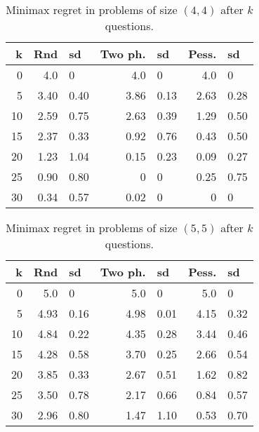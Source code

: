 \begin{table}
	\begin{center}
		\begin{tabular}{rr@{ ± }lr@{ ± }lr@{ ± }l}
			\toprule
			k & Rnd & sd & Two ph. & sd & Pess. & sd \\
			\midrule
			0 & 4.0 & 0 & 4.0 & 0 & 4.0 & 0\\
			5 & 3.40 & 0.40 & 3.86 & 0.13 & 2.63 & 0.28\\
			10 & 2.59 & 0.75 & 2.63 & 0.39 & 1.29 & 0.50\\
			15 & 2.37 & 0.33 & 0.92 & 0.76 & 0.43 & 0.50\\
			20 & 1.23 & 1.04 & 0.15 & 0.23 & 0.09 & 0.27\\
			25 & 0.90 & 0.80 & 0 & 0 & 0.25 & 0.75 \\
			30 & 0.34 & 0.57 & 0.02 & 0 & 0 & 0\\
			\bottomrule
		\end{tabular}
	\end{center}
	\caption{Minimax regret in problems of size $(4, 4)$ after $k$ questions.}
	\label{fig:xp1}
\end{table}

\begin{table}
	\begin{center}
		\begin{tabular}{rr@{ ± }lr@{ ± }lr@{ ± }l}
			\toprule
			k & Rnd & sd & Two ph. & sd & Pess. & sd \\
			\midrule
			0 & 5.0 & 0 & 5.0 & 0 & 5.0 & 0\\
			5 & 4.93 & 0.16 & 4.98 & 0.01 & 4.15 & 0.32\\
			10 & 4.84 & 0.22 & 4.35 & 0.28 & 3.44 & 0.46\\
			15 & 4.28 & 0.58 & 3.70 & 0.25 & 2.66 &0.54 \\
			20 & 3.85 & 0.33 & 2.67 & 0.51 & 1.62 & 0.82\\
			25 & 3.50 & 0.78 & 2.17 & 0.66 & 0.84 &  0.57\\
			30 & 2.96 & 0.80 & 1.47 & 1.10 & 0.53 & 0.70\\
			\bottomrule
		\end{tabular}
	\end{center}
	\caption{Minimax regret in problems of size $(5, 5)$ after $k$ questions.}
	\label{fig:xp2}
\end{table}

